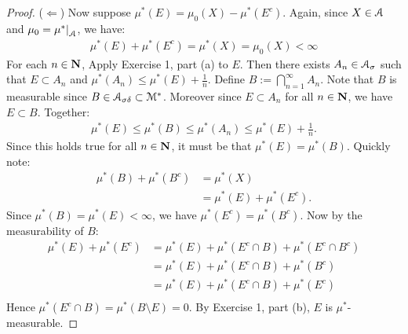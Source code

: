 \documentclass[10pt,twoside,openany]{memoir}
\begin{document}
\begin{proof}
        ($\Leftarrow$) Now suppose $\mu^\ast(E) = \mu_0(X) - \mu^\ast(E^c)$. Again, since $X\in \mathcal{A}$ and $\mu_0 = \restr{\mu^\ast}{\cA}$, we have:
            \begin{equation*}
            \begin{split}
                \mu^\ast(E) + \mu^\ast(E^c) = \mu^\ast(X) = \mu_0(X) < \infty
            \end{split}
            \end{equation*}
        For each $n \in \mathbf{N}$, Apply Exercise 1, part (a) to $E$. Then there exists $A_n \in \mathcal{A}_\sigma$ such that $E \subset A_n$ and $\mu^\ast(A_n) \leq \mu^\ast(E) + \frac{1}{n}$. Define $B := \bigcap_{n = 1}^\infty A_n$. Note that $B$ is measurable since $B \in \mathcal{A}_{\sigma\delta} \subset \mathcal{M}^\ast$. Moreover since $E \subset A_n$ for all $n \in \mathbf{N}$, we have $E \subset B$. Together:
            \begin{equation*}
            \begin{split}
                \mu^\ast(E) \leq \mu^\ast(B) \leq \mu^\ast(A_n) \leq \mu^\ast(E) + \frac{1}{n}.
            \end{split}
            \end{equation*}
        Since this holds true for all $n \in \mathbf{N}$, it must be that $\mu^\ast(E) = \mu^\ast(B)$. Quickly note:
            \begin{equation*}
            \begin{split}
                \mu^\ast(B) + \mu^\ast(B^c) 
                & = \mu^\ast(X) \\
                & = \mu^\ast(E) + \mu^\ast(E^c).
            \end{split}
            \end{equation*}
        Since $\mu^\ast(B) = \mu^\ast(E) < \infty$, we have $\mu^\ast(E^c) = \mu^\ast(B^c)$. Now by the measurability of $B$:
            \begin{equation*}
            \begin{split}
                \mu^\ast (E) + \mu^\ast(E^c) 
                & = \mu^\ast(E) + \mu^\ast(E^c \cap B) + \mu^\ast(E^c \cap B^c) \\
                & = \mu^\ast(E) + \mu^\ast(E^c \cap B) + \mu^\ast(B^c) \\
                & = \mu^\ast(E) + \mu^\ast(E^c \cap B) + \mu^\ast(E^c) \\
            \end{split}
            \end{equation*}
        Hence $\mu^\ast(E^c \cap B) = \mu^\ast(B \setminus E) = 0$. By Exercise 1, part (b), $E$ is $\mu^\ast$-measurable.
    \end{proof}

\end{document}
